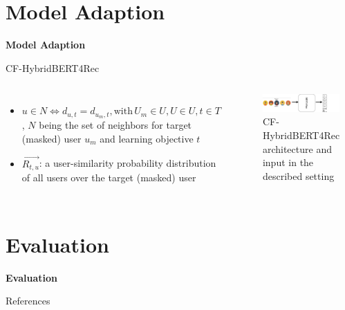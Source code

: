 \documentclass[en]{sdqbeamer}
\begin{document}
\section{Model Adaption}
\begin{frame}
	\centering\textbf{\LARGE{Model Adaption}}
\end{frame}

\begin{frame}{CF-HybridBERT4Rec}
	\begin{columns}
			\begin{itemize}
				\item $u \in N \iff d_{u, t} = d_{u_{m}, t}, \mathrm{with} \, U_m \in U, U \in U, t \in T$, $N$ being the set of neighbors for target (masked) user $u_{m}$ and learning objective $t$
				\item $\overrightarrow{R_{t,u}}$: a user-similarity probability distribution of all users over the target (masked) user
			\end{itemize}
		\begin{figure}
			\includegraphics[width=\textwidth]{images/CF_use_case.pdf}
			\caption{CF-HybridBERT4Rec architecture and input in the described setting}
		\end{figure}
	\end{columns}
\end{frame}

\section{Evaluation}
\begin{frame}
	\centering\textbf{\LARGE{Evaluation}}
\end{frame}

\appendix
\beginbackup
\begin{frame}{References}
	\printbibliography
\end{frame}

\backupend
\end{document}
